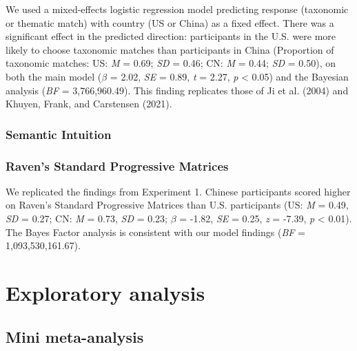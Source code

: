 \documentclass[
  man]{apa6}
\begin{document}
We used a mixed-effects logistic regression model predicting response (taxonomic or thematic match) with country (US or China) as a fixed effect. There was a significant effect in the predicted direction: participants in the U.S. were more likely to choose taxonomic matches than participants in China (Proportion of taxonomic matches: US: \emph{M} = 0.69; \emph{SD} = 0.46; CN: \emph{M} = 0.44; \emph{SD} = 0.50), on both the main model (\(\beta\) = 2.02, \emph{SE} = 0.89, \emph{t} = 2.27, \emph{p} \textless{} 0.05) and the Bayesian analysis (\emph{BF} = 3,766,960.49). This finding replicates those of Ji et al. (2004) and Khuyen, Frank, and Carstensen (2021).

\hypertarget{semantic-intuition-1}{%
\subsubsection{Semantic Intuition}\label{semantic-intuition-1}}

\hypertarget{ravens-standard-progressive-matrices-2}{%
\subsubsection{Raven's Standard Progressive Matrices}\label{ravens-standard-progressive-matrices-2}}

We replicated the findings from Experiment 1. Chinese participants scored higher on Raven's Standard Progressive Matrices than U.S. participants (US: \emph{M} = 0.49, \emph{SD} = 0.27; CN: \emph{M} = 0.73, \emph{SD} = 0.23; \(\beta\) = -1.82, \emph{SE} = 0.25, \emph{z} = -7.39, \emph{p} \textless{} 0.01). The Bayes Factor analysis is consistent with our model findings (\emph{BF} = 1,093,530,161.67).

\hypertarget{exploratory-analysis}{%
\section{Exploratory analysis}\label{exploratory-analysis}}

\hypertarget{mini-meta-analysis}{%
\subsection{Mini meta-analysis}\label{mini-meta-analysis}}
\end{document}
